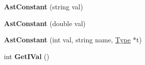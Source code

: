 \begin{DoxyCompactItemize}
\item 
\hypertarget{classAstConstant_a071adbaa9ea9ad30cde38d68b4182cd9}{{\bfseries Ast\-Constant} (string val)}\label{classAstConstant_a071adbaa9ea9ad30cde38d68b4182cd9}

\item 
\hypertarget{classAstConstant_aef9142c2750c7ad8e83183c7b8ade0e8}{{\bfseries Ast\-Constant} (double val)}\label{classAstConstant_aef9142c2750c7ad8e83183c7b8ade0e8}

\item 
\hypertarget{classAstConstant_a9ceaff3b1de813268a88d7fded0aeb0c}{{\bfseries Ast\-Constant} (int val, string name, \hyperlink{classType}{Type} $\ast$t)}\label{classAstConstant_a9ceaff3b1de813268a88d7fded0aeb0c}

\item 
\hypertarget{classAstConstant_af9d81586158302f949f98f21bf4e8f5d}{int {\bfseries Get\-I\-Val} ()}\label{classAstConstant_af9d81586158302f949f98f21bf4e8f5d}


\end{DoxyCompactItemize}
